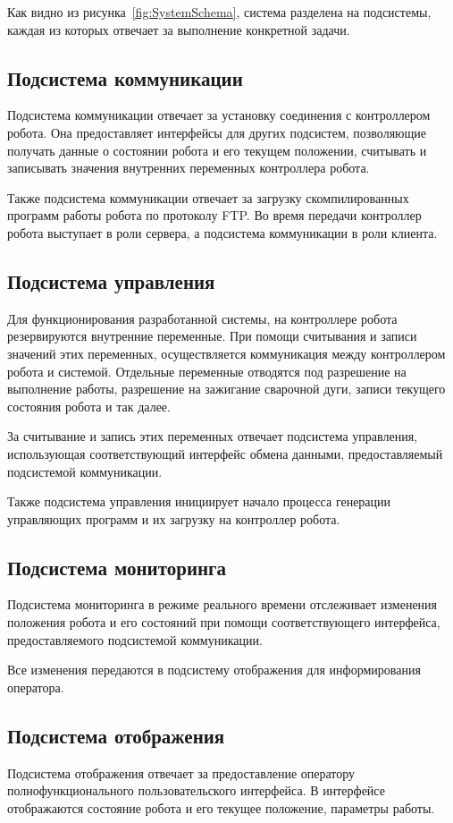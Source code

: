 Как видно из рисунка~\ref{fig:SystemSchema}, система разделена на подсистемы, каждая из которых отвечает за выполнение конкретной задачи.

\subsection{Подсистема коммуникации}
Подсистема коммуникации отвечает за установку соединения с контроллером робота.
Она предоставляет интерфейсы для других подсистем, позволяющие получать данные о состоянии робота и его текущем положении, считывать и записывать значения внутренних переменных контроллера робота.

Также подсистема коммуникации отвечает за загрузку скомпилированных программ работы робота по протоколу FTP. Во время передачи контроллер робота выступает в роли сервера, а подсистема коммуникации в роли клиента.

\subsection{Подсистема управления}
Для функционирования разработанной системы, на контроллере робота резервируются внутренние переменные.
При помощи считывания и записи значений этих переменных, осуществляется коммуникация между контроллером робота и системой.
Отдельные переменные отводятся под разрешение на выполнение работы, разрешение на зажигание сварочной дуги, записи текущего состояния робота и так далее.

За считывание и запись этих переменных отвечает подсистема управления, использующая соответствующий интерфейс обмена данными, предоставляемый подсистемой коммуникации.

Также подсистема управления инициирует начало процесса генерации управляющих программ и их загрузку на контроллер робота.

\subsection{Подсистема мониторинга}
Подсистема мониторинга в режиме реального времени отслеживает изменения положения робота и его состояний при помощи соответствующего интерфейса, предоставляемого подсистемой коммуникации.

Все изменения передаются в подсистему отображения для информирования оператора.

\subsection{Подсистема отображения}
Подсистема отображения отвечает за предоставление оператору полнофункционального пользовательского интерфейса.
В интерфейсе отображаются состояние робота и его текущее положение, параметры работы.

